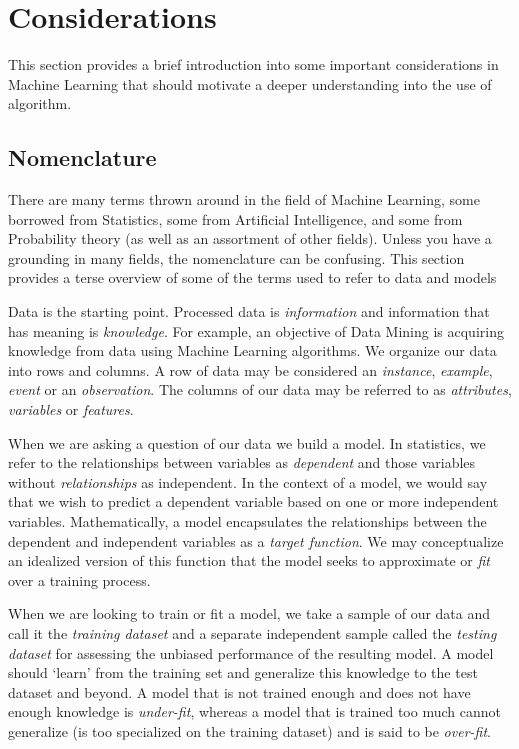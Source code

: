 
\section{Considerations} 
\label{intro:considerations}
This section provides a brief introduction into some important considerations in Machine Learning that should motivate a deeper understanding into the use of algorithm.

\subsection{Nomenclature}
There are many terms thrown around in the field of Machine Learning, some borrowed from Statistics, some from Artificial Intelligence, and some from Probability theory (as well as an assortment of other fields). Unless you have a grounding in many fields, the nomenclature can be confusing. This section provides a terse overview of some of the terms used to refer to data and models

Data is the starting point. Processed data is \emph{information} and information that has meaning is \emph{knowledge}. For example, an objective of Data Mining is acquiring knowledge from data using Machine Learning algorithms. We organize our data into rows and columns. A row of data may be considered an \emph{instance}, \emph{example}, \emph{event} or an \emph{observation}. The columns of our data may be referred to as \emph{attributes}, \emph{variables} or \emph{features}. 

When we are asking a question of our data we build a model. In statistics, we refer to the relationships between variables as \emph{dependent} and those variables without \emph{relationships} as independent. In the context of a model, we would say that we wish to predict a dependent variable based on one or more independent variables. Mathematically, a model encapsulates the relationships between the dependent and independent variables as a \emph{target function}. We may conceptualize an idealized version of this function that the model seeks to approximate or \emph{fit} over a training process. 

When we are looking to train or fit a model, we take a sample of our data and call it the \emph{training dataset} and a separate independent sample called the \emph{testing dataset} for assessing the unbiased performance of the resulting model. A model should `learn' from the training set and generalize this knowledge to the test dataset and beyond. A model that is not trained enough and does not have enough knowledge is \emph{under-fit}, whereas a model that is trained too much cannot generalize (is too specialized on the training dataset) and is said to be \emph{over-fit}.

